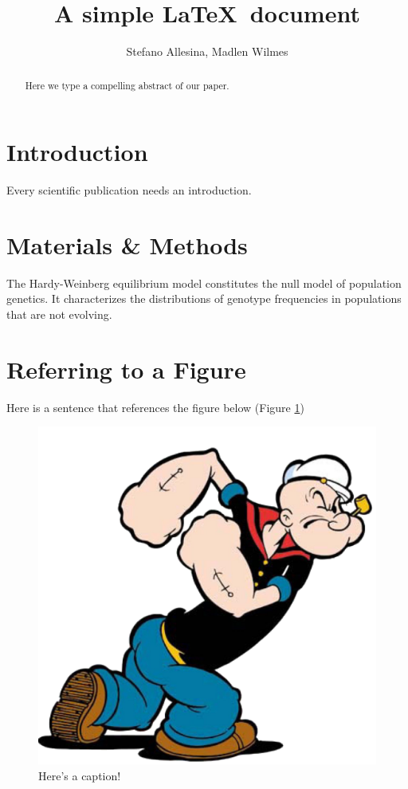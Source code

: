 \documentclass[12pt]{article}
\title{A simple \LaTeX\ document}
\author{Stefano Allesina, Madlen Wilmes}
\date{}
\begin{document}
\maketitle
\begin{abstract}
Here we type a compelling abstract of our paper.
\end{abstract}
\section{Introduction}
Every scientific publication needs an introduction.
\section{Materials \& Methods}
The Hardy-Weinberg equilibrium model constitutes the null model of population genetics. It characterizes the distributions of genotype  frequencies in populations that are not evolving.
\section{Referring to a Figure}
Here is a sentence that references the figure below (Figure \ref{fig:pop})

\begin{figure}
  \label{fig:pop}
\begin{center}
 \includegraphics[width=0.5\linewidth]{figures/popeye.png}
\end{center}
\caption{Here's a caption!}

 \end{figure}
\end{document}
